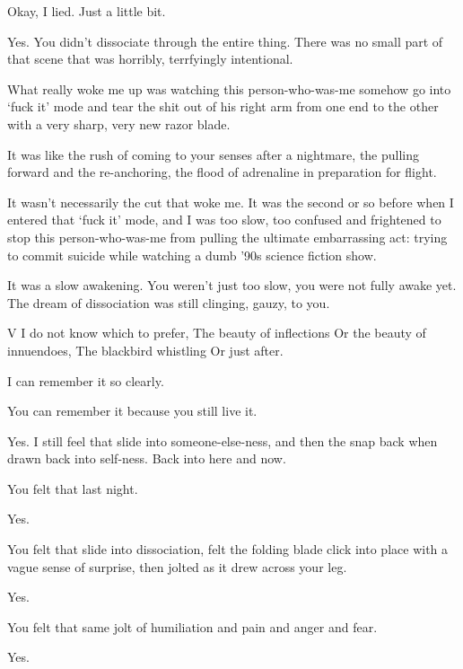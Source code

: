\begin{paracol}{2}
\begin{leftcolumn}
\noindent Okay, I lied. Just a little bit.

\begin{ally}
Yes. You didn't dissociate through the entire thing. There was no small part of that scene that was horribly, terrfyingly intentional.
\end{ally}
What really woke me up was watching this person-who-was-me somehow go into `fuck it' mode and tear the shit out of his right arm from one end to the other with a very sharp, very new razor blade.

It was like the rush of coming to your senses after a nightmare, the pulling forward and the re-anchoring, the flood of adrenaline in preparation for flight.

It wasn't necessarily the cut that woke me. It was the second or so before when I entered that `fuck it' mode, and I was too slow, too confused and frightened to stop this person-who-was-me from pulling the ultimate embarrassing act: trying to commit suicide while watching a dumb '90s science fiction show.

\begin{ally}
It was a slow awakening. You weren't just too slow, you were not fully awake yet. The dream of dissociation was still clinging, gauzy, to you.
\end{ally}
V I do not know which to prefer, The beauty of inflections Or the beauty of innuendoes, The blackbird whistling Or just after.

I can remember it so clearly.

\begin{ally}
You can remember it because you still live it.
\end{ally}
Yes. I still feel that slide into someone-else-ness, and then the snap back when drawn back into self-ness. Back into here and now.

\begin{ally}
You felt that last night.
\end{ally}
Yes.

\begin{ally}
You felt that slide into dissociation, felt the folding blade click into place with a vague sense of surprise, then jolted as it drew across your leg.
\end{ally}
Yes.

\begin{ally}
You felt that same jolt of humiliation and pain and anger and fear.
\end{ally}
Yes.


\end{leftcolumn}
\end{paracol}
